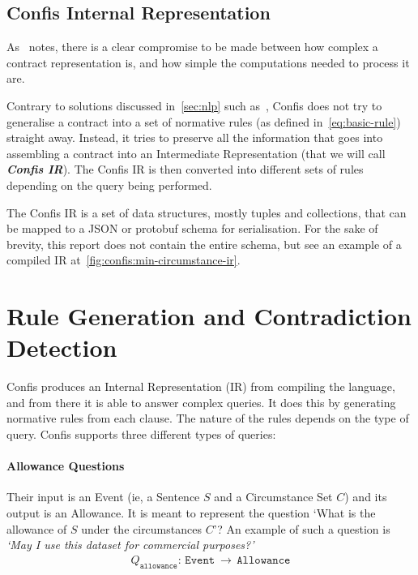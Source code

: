 \subsection{Confis Internal Representation}\label{subsec:confis-ir}
As~\cite{knottenbeltContractDriven} notes, there is a clear compromise to be made between how complex a contract representation is, and how simple the computations needed to process it are.

Contrary to solutions discussed in~\autoref{sec:nlp} such as~\cite{sleimi2018NLP4}, Confis does not try to generalise a contract into a set of normative rules (as defined in~\autoref{eq:basic-rule}) straight away.
Instead, it tries to preserve all the information that goes into assembling a contract into an Intermediate Representation (that we will call \textbf{\emph{Confis IR}}).
The Confis IR is then converted into different sets of rules depending on the query being performed.

The Confis IR is a set of data structures, mostly tuples and collections, that can be mapped to a JSON or protobuf schema for serialisation.
For the sake of brevity, this report does not contain the entire schema, but see an example of a compiled IR at~\autoref{fig:confis:min-circumstance-ir}.


\section{Rule Generation and Contradiction Detection}\label{sec:rule-generation}

Confis produces an Internal Representation (IR) from compiling the language, and from there it is able to answer complex queries.
It does this by generating normative rules from each clause.
The nature of the rules depends on the type of query.
Confis supports three different types of queries:

\paragraph{Allowance Questions} Their input is an Event (ie, a Sentence $S$ and a Circumstance Set $C$) and its output is an Allowance.
It is meant to represent the question `What is the allowance of $S$ under the circumstances $C$'?
An example of such a question is \emph{`May I use this dataset for commercial purposes?'}
\begin{gather}
    \nonumber
    Q_\texttt{allowance}: \, \texttt{Event}\ \to\, \texttt{Allowance}
\end{gather}

